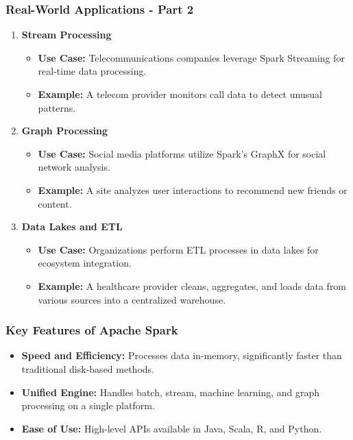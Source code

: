 \documentclass{beamer}
\begin{document}
\begin{frame}[fragile]
    \frametitle{Real-World Applications - Part 2}
    \begin{enumerate}[resume]
        \item \textbf{Stream Processing}
            \begin{itemize}
                \item \textbf{Use Case:} Telecommunications companies leverage Spark Streaming for real-time data processing.
                \item \textbf{Example:} A telecom provider monitors call data to detect unusual patterns.
            \end{itemize}

        \item \textbf{Graph Processing}
            \begin{itemize}
                \item \textbf{Use Case:} Social media platforms utilize Spark's GraphX for social network analysis.
                \item \textbf{Example:} A site analyzes user interactions to recommend new friends or content.
            \end{itemize}

        \item \textbf{Data Lakes and ETL}
            \begin{itemize}
                \item \textbf{Use Case:} Organizations perform ETL processes in data lakes for ecosystem integration.
                \item \textbf{Example:} A healthcare provider cleans, aggregates, and loads data from various sources into a centralized warehouse.
            \end{itemize}
    \end{enumerate}
\end{frame}

\begin{frame}[fragile]
    \frametitle{Key Features of Apache Spark}
    \begin{itemize}
        \item \textbf{Speed and Efficiency:} Processes data in-memory, significantly faster than traditional disk-based methods.
        \item \textbf{Unified Engine:} Handles batch, stream, machine learning, and graph processing on a single platform.
        \item \textbf{Ease of Use:} High-level APIs available in Java, Scala, R, and Python.
    \end{itemize}
\end{frame}
\end{document}

